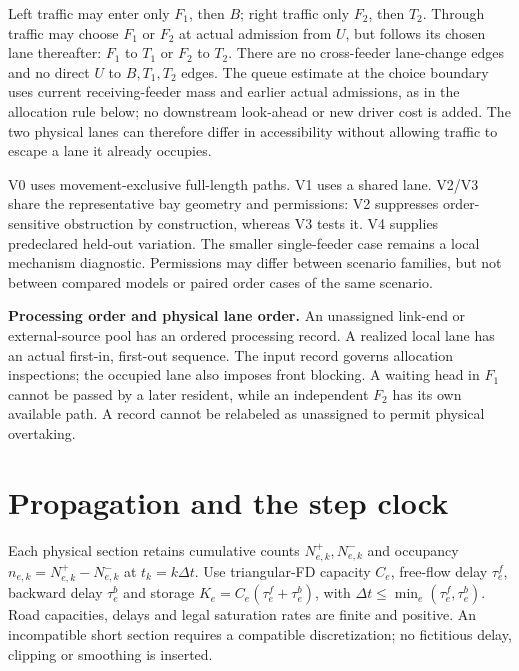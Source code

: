 \documentclass[10pt,a4paper]{article}
\begin{document}
Left traffic may enter only $F_1$, then $B$; right traffic only $F_2$,
then $T_2$. Through traffic may choose $F_1$ or $F_2$ at actual admission
from $U$, but follows its chosen lane thereafter: $F_1$ to $T_1$ or
$F_2$ to $T_2$. There are no cross-feeder lane-change edges and no direct
$U$ to $B,T_1,T_2$ edges. The queue estimate at the choice boundary uses
current receiving-feeder mass and earlier actual admissions, as in the
allocation rule below; no downstream look-ahead or new driver cost is added.
The two physical lanes can therefore differ in accessibility without
allowing traffic to escape a lane it already occupies.

V0 uses movement-exclusive full-length paths. V1 uses a shared lane.
V2/V3 share the representative bay geometry and permissions: V2 suppresses
order-sensitive obstruction by construction, whereas V3 tests it.
V4 supplies predeclared held-out variation. The smaller single-feeder
case remains a local mechanism diagnostic. Permissions may differ
between scenario families, but not between compared models or paired
order cases of the same scenario.

\textbf{Processing order and physical lane order.}
An unassigned link-end or external-source pool has an ordered processing
record. A realized local lane has an actual first-in, first-out sequence.
The input record governs allocation inspections; the occupied lane also
imposes front blocking. A waiting head in $F_1$ cannot be passed by a
later resident, while an independent $F_2$ has its own available path.
A record cannot be relabeled as unassigned to permit physical overtaking.

\section{Propagation and the step clock}

Each physical section retains cumulative counts $N^+_{e,k},N^-_{e,k}$
and occupancy $n_{e,k}=N^+_{e,k}-N^-_{e,k}$ at $t_k=k\Delta t$.
Use triangular-FD capacity $C_e$, free-flow delay $\tau^f_e$, backward
delay $\tau^b_e$ and storage $K_e=C_e(\tau^f_e+\tau^b_e)$, with
$\Delta t\leq\min_e(\tau^f_e,\tau^b_e)$.
Road capacities, delays and legal saturation rates are finite and positive.
An incompatible short section requires a compatible discretization;
no fictitious delay, clipping or smoothing is inserted.
\end{document}
